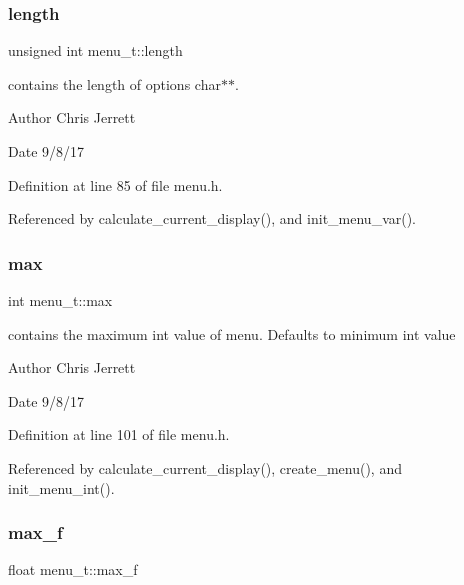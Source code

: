 \subsubsection{\texorpdfstring{length}{length}}
{\footnotesize\ttfamily unsigned int menu\+\_\+t\+::length}



contains the length of options char$\ast$$\ast$. 

\begin{DoxyAuthor}{Author}
Chris Jerrett 
\end{DoxyAuthor}
\begin{DoxyDate}{Date}
9/8/17 
\end{DoxyDate}


Definition at line 85 of file menu.\+h.



Referenced by calculate\+\_\+current\+\_\+display(), and init\+\_\+menu\+\_\+var().

\mbox{\label{structmenu__t_ace9cbaecd7bf311be0ef230da657f406}} 
\subsubsection{\texorpdfstring{max}{max}}
{\footnotesize\ttfamily int menu\+\_\+t\+::max}



contains the maximum int value of menu. Defaults to minimum int value 

\begin{DoxyAuthor}{Author}
Chris Jerrett 
\end{DoxyAuthor}
\begin{DoxyDate}{Date}
9/8/17 
\end{DoxyDate}


Definition at line 101 of file menu.\+h.



Referenced by calculate\+\_\+current\+\_\+display(), create\+\_\+menu(), and init\+\_\+menu\+\_\+int().

\mbox{\label{structmenu__t_a14b11d0a7610484462c8a6e93068a2c1}} 
\subsubsection{\texorpdfstring{max\+\_\+f}{max\_f}}
{\footnotesize\ttfamily float menu\+\_\+t\+::max\+\_\+f}



